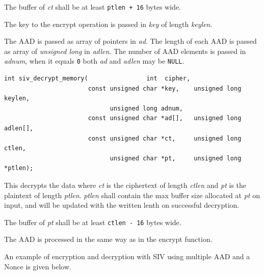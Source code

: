 \documentclass[synpaper]{book}
\begin{document}
The buffer of \textit{ct} shall be at least \texttt{ptlen + 16} bytes wide.

The key to the encrypt operation is passed in \textit{key} of length  \textit{keylen}.

The AAD is passed as array of pointers in \textit{ad}. The length of each AAD is passed as array of
\textit{unsigned long} in \textit{adlen}.
The number of AAD elements is passed in \textit{adnum}, when it equals \texttt{0} both \textit{ad} and \textit{adlen} may be \texttt{NULL}.

\begin{verbatim}
int siv_decrypt_memory(                int  cipher,
                       const unsigned char *key,    unsigned long  keylen,
                             unsigned long adnum,
                       const unsigned char *ad[],   unsigned long  adlen[],
                       const unsigned char *ct,     unsigned long  ctlen,
                             unsigned char *pt,     unsigned long *ptlen);
\end{verbatim}
This decrypts the data where \textit{ct} is the ciphertext of length \textit{ctlen} and \textit{pt} is the plaintext of length \textit{ptlen}.
\textit{ptlen} shall contain the max buffer size allocated at \textit{pt} on input, and will be updated with the
written lenth on successful decryption.

The buffer of \textit{pt} shall be at least \texttt{ctlen - 16} bytes wide.

The AAD is processed in the same way as in the encrypt function.

An example of encryption and decryption with SIV using multiple AAD and a Nonce is given below.
\end{document}
